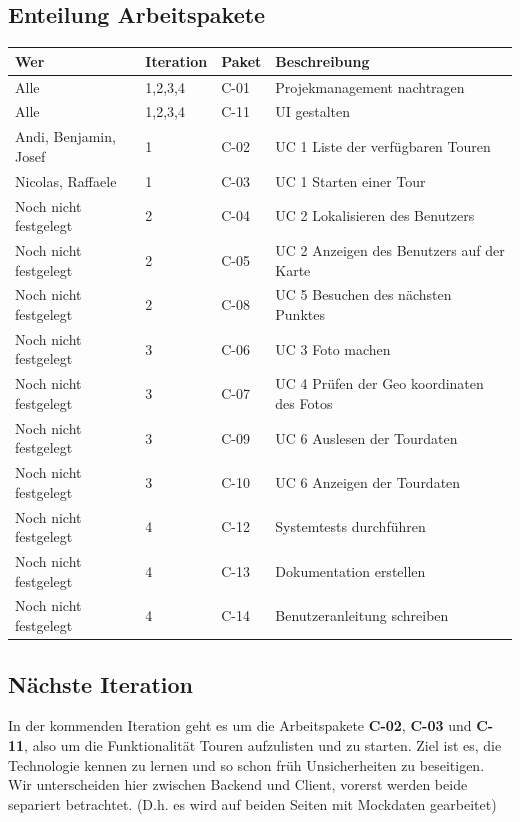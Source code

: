 \documentclass[a4paper,10pt,xetex]{article}
\begin{document}
\subsection{Enteilung Arbeitspakete}\label{enteilung-arbeitspakete}
\begin{longtabu} to \textwidth { | l | l | l | X[l] | }
\hline
\textbf{Wer} & \textbf{Iteration} & \textbf{Paket} & \textbf{Beschreibung} \\\hline
\endhead

Alle                         & 1,2,3,4 & C-01 & Projekmanagement nachtragen \\\hline
Alle                         & 1,2,3,4 & C-11 & UI gestalten \\\hline
Andi, Benjamin, Josef        & 1       & C-02 & UC 1 Liste der verfügbaren Touren \\\hline
Nicolas, Raffaele            & 1       & C-03 & UC 1 Starten einer Tour \\\hline
Noch nicht festgelegt        & 2       & C-04 & UC 2 Lokalisieren des Benutzers \\\hline
Noch nicht festgelegt        & 2       & C-05 & UC 2 Anzeigen des Benutzers auf der Karte \\\hline
Noch nicht festgelegt        & 2       & C-08 & UC 5 Besuchen des nächsten Punktes \\\hline
Noch nicht festgelegt        & 3       & C-06 & UC 3 Foto machen \\\hline
Noch nicht festgelegt        & 3       & C-07 & UC 4 Prüfen der Geo koordinaten des Fotos \\\hline
Noch nicht festgelegt        & 3       & C-09 & UC 6 Auslesen der Tourdaten \\\hline
Noch nicht festgelegt        & 3       & C-10 & UC 6 Anzeigen der Tourdaten \\\hline
Noch nicht festgelegt        & 4       & C-12 & Systemtests durchführen \\\hline
Noch nicht festgelegt        & 4       & C-13 & Dokumentation erstellen \\\hline
Noch nicht festgelegt        & 4       & C-14 & Benutzeranleitung schreiben \\\hline
\end{longtabu}

\subsection{Nächste Iteration}\label{naechste-iteration}
In der kommenden Iteration geht es um die Arbeitspakete \textbf{C-02}, \textbf{C-03} und \textbf{C-11}, also um die Funktionalität Touren aufzulisten und zu starten.
Ziel ist es, die Technologie kennen zu lernen und so schon früh Unsicherheiten zu beseitigen. Wir unterscheiden hier zwischen Backend und Client, vorerst werden beide separiert betrachtet.
(D.h. es wird auf beiden Seiten mit Mockdaten gearbeitet)
\end{document}
